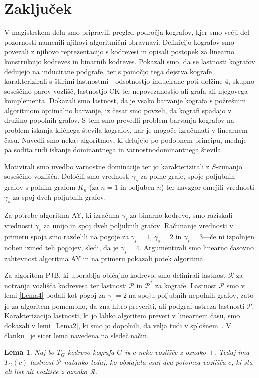 \documentclass[12pt,a4paper,twoside]{article}
\theoremstyle{definition} %
\theoremstyle{plain} %
\newtheorem{lema}[definicija]{Lema}
\numberwithin{equation}{section}  %
\begin{document}
\section{Zaključek}
V magistrskem delu smo pripravili pregled področja kografov, kjer smo večji del pozornosti namenili njihovi algoritmični obravnavi. Definicijo kografov smo povezali z njihovo reprezentacijo s kodrevesi in opisali postopek za linearno konstrukcijo kodreves in binarnih kodreves. Pokazali smo, da se lastnosti kografov dedujejo na inducirane podgrafe, ter s pomočjo tega dejstva kografe karakterizirali s štirimi lastnostmi---odsotnostjo inducirane poti dolžine 4, skupno soseščino parov vozlišč, lastnostjo CK ter nepovezanostjo ali grafa ali njegovega komplementa. Dokazali smo lastnost, da je vsako barvanje kografa s požrešnim algoritmom optimalno barvanje, iz česar smo povzeli, da kografi spadajo v družino popolnih grafov. S tem smo prevedli problem barvanja kografov na problem iskanja kličnega števila kografov, kar je mogoče izračunati v linearnem času. Navedli smo nekaj algoritmov, ki delujejo po podobnem principu, mednje pa sodita tudi iskanje dominantnega in varnostnodominantnega števila.

Motivirali smo uvedbo varnostne dominacije ter jo karakterizirali z $S$-zunanjo soseščino vozlišča. Določili smo vrednosti $\gamma_s$ za polne grafe, spoje poljubnih grafov s polnim grafom $K_n$ (za $n=1$ in poljuben $n$) ter navzgor omejili vrednosti $\gamma_s$ za spoj dveh poljubnih grafov.

Za potrebe algoritma AY, ki izračuna $\gamma_s$ za binarno kodrevo, smo raziskali vrednosti $\gamma_s$ za unijo in spoj dveh poljubnih grafov. Računanje vrednosti v primeru spoja smo razdelili na pogoje za $\gamma_s=1$, $\gamma_s=2$ in $\gamma_s=3$---če ni izpolnjen noben izmed teh pogojev, sledi, da je $\gamma_s = 4$. Argumentirali smo linearno časovno zahtevnost algoritma AY in na primeru pokazali potek algoritma. 

Za algoritem PJB, ki uporablja običajno kodrevo, smo definirali lastnost $\mathcal{R}$ za notranja vozlišča kodrevesa ter lastnosti $\mathcal{P}$ in $\mathcal{P^*}$ za kografe. Lastnost $\mathcal{P}$ smo v lemi \ref{Lema4} podali kot pogoj za $\gamma_s = 2$ na spoju poljubnih nepolnih grafov, zato je za algoritem pomembno, da zna hitro preveriti, ali podgraf ustreza lastnosti $\mathcal{P}$. Karakterizacijo lastnosti, ki jo lahko algoritem preveri v linearnem času, smo dokazali v lemi~\ref{Lema2}, ki smo jo dopolnili, da velja tudi v splošnem~\cite{kisek2020onJha}. V članku~\cite{jha2019secure} je sicer lema navedena na sledeč način.
\begin{lema}{\rm{\cite[Lemma 2]{jha2019secure}}}\label{OriginalLemma2} Naj bo $T_G$ kodrevo kografa $G$ in $c$ neko vozlišče z oznako $+$. Tedaj ima $T_G(c)$ lastnost $\mathcal{P}$ natanko tedaj, ko obstajata vsaj dva potomca vozlišča $c$, ki sta ali list ali vozlišče z oznako $\mathcal{R}$.
\end{lema}
\end{document}
